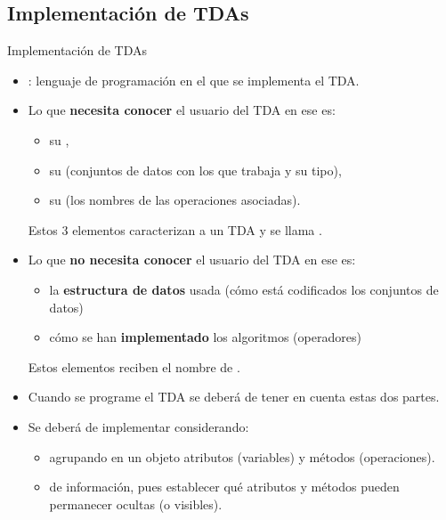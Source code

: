 \documentclass[10pt,envcountsect,spanish]{beamer}
\begin{document}
\subsection{Implementación de TDAs}

\begin{frame}{Implementación de TDAs}


\begin{itemize}
\item \underline{}: lenguaje de programación en el que se  implementa el TDA.
\item Lo que \textbf{necesita conocer} el usuario del TDA en ese \underline{} es:
	 \small
	\begin{itemize}
	\item su , 
	\item su  (conjuntos de datos con los que trabaja y su tipo), 
	\item su  (los nombres de las operaciones asociadas). 
	\end{itemize}
	
	Estos 3 elementos caracterizan a un TDA y se llama .
	\normalsize
	
\item Lo que \textbf{no necesita conocer} el usuario del TDA en ese \underline{} es:
	\small
	\begin{itemize} 
	\item la \textbf{estructura de datos} usada (cómo está codificados los conjuntos de datos)
	\item cómo se han \textbf{implementado} los algoritmos (operadores)
	\end{itemize}
	
	Estos elementos reciben el nombre de .
	\normalsize
	
\item Cuando se programe el TDA se deberá de tener en cuenta estas dos partes.

\item Se deberá de implementar considerando:

	\small
	\begin{itemize} 
	\item {} agrupando en un objeto atributos (variables) y métodos (operaciones).
	\item {} de información, pues establecer qué atributos y métodos pueden permanecer ocultas (o visibles).
	\end{itemize}
	\normalsize
	

\end{itemize}
\end{frame}
\end{document}
